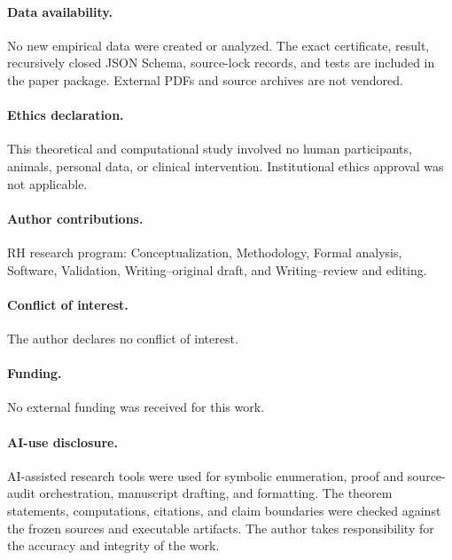 \documentclass[11pt]{article}
\theoremstyle{definition}
\theoremstyle{remark}
\begin{document}
\paragraph{Data availability.}
No new empirical data were created or analyzed.  The exact certificate,
result, recursively closed JSON Schema, source-lock records, and tests are
included in the paper package.  External PDFs and source archives are not
vendored.

\paragraph{Ethics declaration.}
This theoretical and computational study involved no human participants,
animals, personal data, or clinical intervention.  Institutional ethics
approval was not applicable.

\paragraph{Author contributions.}
RH research program: Conceptualization, Methodology, Formal analysis,
Software, Validation, Writing--original draft, and Writing--review and
editing.

\paragraph{Conflict of interest.}
The author declares no conflict of interest.

\paragraph{Funding.}
No external funding was received for this work.

\paragraph{AI-use disclosure.}
AI-assisted research tools were used for symbolic enumeration, proof and
source-audit orchestration, manuscript drafting, and formatting.  The
theorem statements, computations, citations, and claim boundaries were
checked against the frozen sources and executable artifacts.  The author
takes responsibility for the accuracy and integrity of the work.

\begingroup
\small


\endgroup
\end{document}
